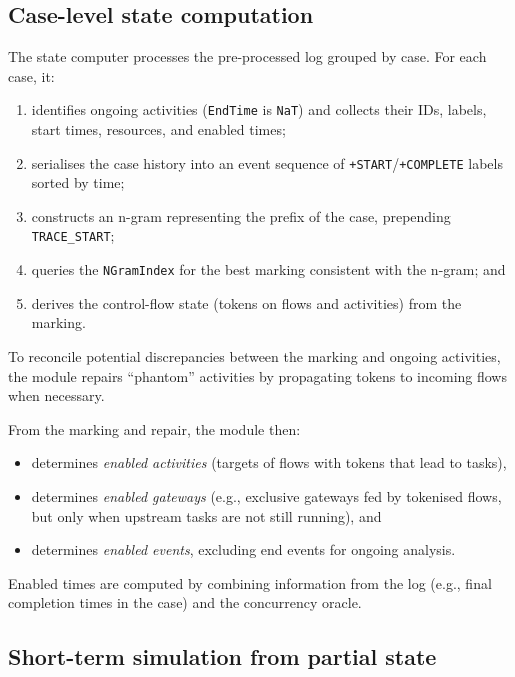 \documentclass[a4paper,fleqn]{cas-sc}
\begin{document}
\subsection{Case-level state computation}

The state computer processes the pre-processed log grouped
by case.
For each case, it:

\begin{enumerate}
  \item identifies ongoing activities (\verb|EndTime| is
  \verb|NaT|) and collects their IDs, labels, start times,
  resources, and enabled times;
  \item serialises the case history into an event sequence of
  \texttt{+START}/\texttt{+COMPLETE} labels sorted by time;
  \item constructs an n-gram representing the prefix of
  the case, prepending \verb|TRACE_START|;
  \item queries the \verb|NGramIndex| for the best marking
  consistent with the n-gram; and
  \item derives the control-flow state (tokens on flows and
  activities) from the marking.
\end{enumerate}

To reconcile potential discrepancies between the marking and
ongoing activities, the module repairs ``phantom'' activities by
propagating tokens to incoming flows when necessary.

From the marking and repair, the module then:

\begin{itemize}
  \item determines \emph{enabled activities} (targets of flows
  with tokens that lead to tasks),
  \item determines \emph{enabled gateways} (e.g., exclusive
  gateways fed by tokenised flows, but only when upstream tasks
  are not still running), and
  \item determines \emph{enabled events}, excluding end events
  for ongoing analysis.
\end{itemize}

Enabled times are computed by combining information from the
log (e.g., final completion times in the case) and the
concurrency oracle.

\subsection{Short-term simulation from partial state}
\end{document}
